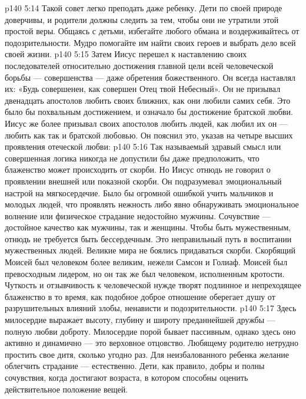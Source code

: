 \vs p140 5:14 Такой совет легко преподать даже ребенку. Дети по своей природе доверчивы, и родители должны следить за тем, чтобы они не утратили этой простой веры. Общаясь с детьми, избегайте любого обмана и воздерживайтесь от подозрительности. Мудро помогайте им найти своих героев и выбрать дело всей своей жизни.
\vs p140 5:15 \pc Затем Иисус перешел к наставлению своих последователей относительно достижения главной цели всей человеческой борьбы --- совершенства --- даже обретения божественного. Он всегда наставлял их: «Будь совершенен, как совершен Отец твой Небесный». Он не призывал двенадцать апостолов любить своих ближних, как они любили самих себя. Это было бы похвальным достижением, и означало бы достижение братской любви. Иисус же более призывал своих апостолов любить людей, как любил их он --- любить как  так и братской любовью. Он пояснил это, указав на четыре высших проявления отеческой любви:
\vs p140 5:16 \bibnobreakspace {} Так называемый здравый смысл или совершенная логика никогда не допустили бы даже предположить, что блаженство может происходить от скорби. Но Иисус отнюдь не говорил о проявлении внешней или показной скорби. Он подразумевал эмоциональный настрой на мягкосердечие. Было бы огромной ошибкой учить мальчиков и молодых людей, что проявлять нежность либо явно обнаруживать эмоциональное волнение или физическое страдание недостойно мужчины. Сочувствие --- достойное качество как мужчины, так и женщины. Чтобы быть мужественным, отнюдь не требуется быть бессердечным. Это неправильный путь в воспитании мужественных людей. Великие мира не боялись придаваться скорби. Скорбящий Моисей был человеком более великим, нежели Самсон и Голиаф. Моисей был превосходным лидером, но он так же был человеком, исполненным кротости. Чуткость и отзывчивость к человеческой нужде творят подлинное и непреходящее блаженство в то время, как подобное доброе отношение оберегает душу от разрушительных влияний злобы, ненависти и подозрительности.
\vs p140 5:17 \bibnobreakspace {} Здесь милосердие выражает высоту, глубину и широту преданнейшей дружбы --- полную любви доброту. Милосердие порой бывает пассивным, однако здесь оно активно и динамично --- это верховное отцовство. Любящему родителю нетрудно простить свое дитя, сколько угодно раз. Для неизбалованного ребенка желание облегчить страдание --- естественно. Дети, как правило, добры и полны сочувствия, когда достигают возраста, в котором способны оценить действительное положение вещей.
